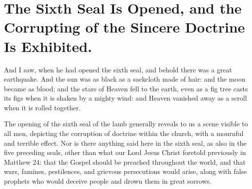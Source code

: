 \chapter[Sermon 33. The Sixth Seal Is Opened, and the Corrupting of the Sincere Doctrine Is Exhibited.]{The Sixth Seal Is Opened, and the Corrupting of the Sincere Doctrine Is Exhibited.}
\label{sermon:033}

And I saw, when he had opened the sixth seal, and behold there was a great earthquake. And the sun was as black as a sackcloth made of hair: and the moon became as blood; and the stars of Heaven fell to the earth, even as a fig tree casts its figs when it is shaken by a mighty wind: and Heaven vanished away as a scroll when it is rolled together.

The opening of the sixth seal of the lamb generally reveals to us a scene visible to all men, depicting the corruption of doctrine within the church, with a mournful and terrible effect. Nor is there anything said here in the sixth seal, as also in the five preceding seals, other than what our Lord Jesus Christ foretold previously in Matthew 24: that the Gospel should be preached throughout the world, and that wars, famines, pestilences, and grievous persecutions would arise, along with false prophets who would deceive people and drown them in great sorrows.

